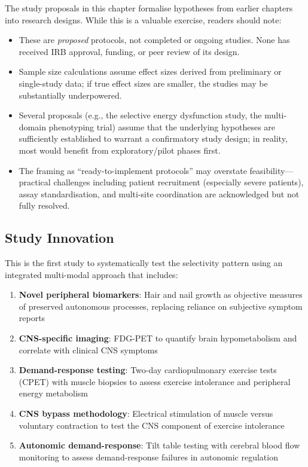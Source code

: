 \begin{limitation}
The study proposals in this chapter formalise hypotheses from earlier chapters into research designs. While this is a valuable exercise, readers should note:
\begin{itemize}
    \item These are \emph{proposed} protocols, not completed or ongoing studies. None has received IRB approval, funding, or peer review of its design.
    \item Sample size calculations assume effect sizes derived from preliminary or single-study data; if true effect sizes are smaller, the studies may be substantially underpowered.
    \item Several proposals (e.g., the selective energy dysfunction study, the multi-domain phenotyping trial) assume that the underlying hypotheses are sufficiently established to warrant a confirmatory study design; in reality, most would benefit from exploratory/pilot phases first.
    \item The framing as ``ready-to-implement protocols'' may overstate feasibility---practical challenges including patient recruitment (especially severe patients), assay standardisation, and multi-site coordination are acknowledged but not fully resolved.
\end{itemize}
\end{limitation}

\subsection{Study Innovation}

This is the first study to systematically test the selectivity pattern using an integrated multi-modal approach that includes:

\begin{enumerate}
    \item \textbf{Novel peripheral biomarkers}: Hair and nail growth as objective measures of preserved autonomous processes, replacing reliance on subjective symptom reports
    \item \textbf{CNS-specific imaging}: FDG-PET to quantify brain hypometabolism and correlate with clinical CNS symptoms
    \item \textbf{Demand-response testing}: Two-day cardiopulmonary exercise tests (CPET) with muscle biopsies to assess exercise intolerance and peripheral energy metabolism
    \item \textbf{CNS bypass methodology}: Electrical stimulation of muscle versus voluntary contraction to test the CNS component of exercise intolerance
    \item \textbf{Autonomic demand-response}: Tilt table testing with cerebral blood flow monitoring to assess demand-response failures in autonomic regulation
\end{enumerate}


